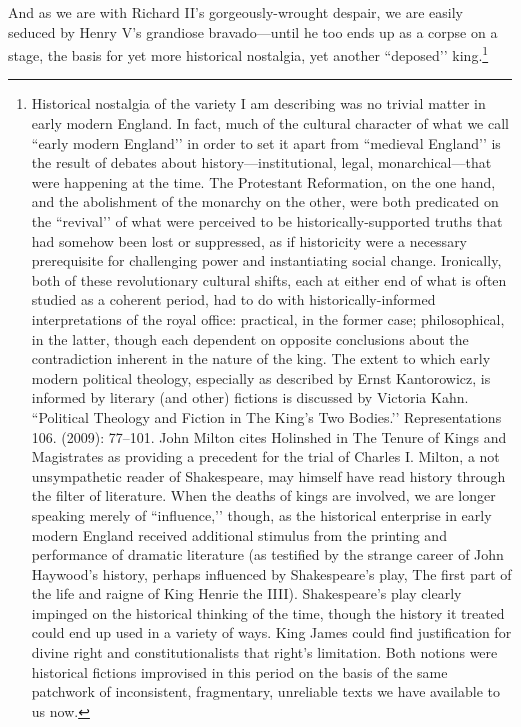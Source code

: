 And as we are with Richard II’s gorgeously-wrought despair, we are easily seduced by Henry V’s grandiose bravado---until he too ends up as a corpse on a stage, the basis for yet more historical nostalgia, yet another ``deposed’’ king.\footnote{Historical nostalgia of the variety I am describing was no trivial matter in early modern England.
In fact, much of the cultural character of what we call ``early modern England’’ in order to set it apart from ``medieval England’’ is the result of debates about history---institutional, legal, monarchical---that were happening at the time.
The Protestant Reformation, on the one hand, and the abolishment of the monarchy on the other, were both predicated on the ``revival’’ of what were perceived to be historically-supported truths that had somehow been lost or suppressed, as if historicity were a necessary prerequisite for challenging power and instantiating social change.
Ironically, both of these revolutionary cultural shifts, each at either end of what is often studied as a coherent period, had to do with historically-informed interpretations of the royal office: practical, in the former case; philosophical, in the latter, though each dependent on opposite conclusions about the contradiction inherent in the nature of the king.
The extent to which early modern political theology, especially as described by Ernst Kantorowicz, is informed by literary (and other) fictions is discussed by Victoria Kahn.
``Political Theology and Fiction in The King’s Two Bodies.’’ Representations 106.
(2009): 77--101.
John Milton cites Holinshed in The Tenure of Kings and Magistrates as providing a precedent for the trial of Charles I.
Milton, a not unsympathetic reader of Shakespeare, may himself have read history through the filter of literature.
When the deaths of kings are involved, we are longer speaking merely of ``influence,’’ though, as the historical enterprise in early modern England received additional stimulus from the printing and performance of dramatic literature (as testified by the strange career of John Haywood’s  history, perhaps influenced by Shakespeare’s play, The first part of the life and raigne of King Henrie the IIII).
Shakespeare’s play clearly impinged on the historical thinking of the time, though the history it treated could end up used in a variety of ways.
King James could find justification for divine right and constitutionalists that right’s limitation.
Both notions were historical fictions improvised in this period on the basis of the same patchwork of inconsistent, fragmentary, unreliable texts we have available to us now.}


